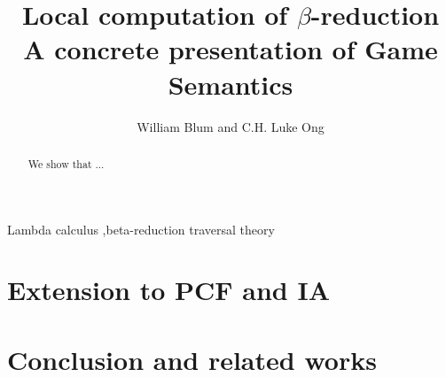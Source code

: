 \documentclass[preprint,12pt,draft]{elsarticle}
\begin{document}
\begin{keyword}
Lambda calculus \sep beta-reduction
traversal theory
\end{keyword}
\begin{frontmatter}
\title{Local computation of $\beta$-reduction\\A concrete presentation of Game Semantics}
\author{William Blum and C.H. Luke Ong}
\address{Oxford University Computing Laboratory}
\begin{abstract}
We show that ...
\end{abstract}
\end{frontmatter}

\tableofcontents \bigskip

\listoftodos
\bigskip

    

    \section{Extension to PCF and IA}
    

    \section{Conclusion and related works}
    




\end{document}
